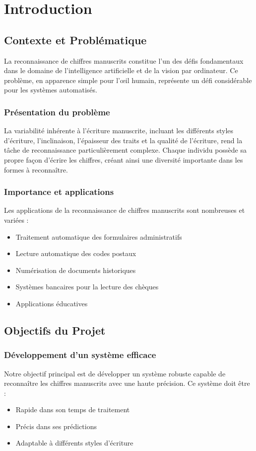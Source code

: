 \chapter{Introduction}

\section{Contexte et Problématique}

La reconnaissance de chiffres manuscrits constitue l'un des défis fondamentaux dans le domaine de l'intelligence artificielle et de la vision par ordinateur. Ce problème, en apparence simple pour l'œil humain, représente un défi considérable pour les systèmes automatisés.

\subsection{Présentation du problème}
La variabilité inhérente à l'écriture manuscrite, incluant les différents styles d'écriture, l'inclinaison, l'épaisseur des traits et la qualité de l'écriture, rend la tâche de reconnaissance particulièrement complexe. Chaque individu possède sa propre façon d'écrire les chiffres, créant ainsi une diversité importante dans les formes à reconnaître.

\subsection{Importance et applications}
Les applications de la reconnaissance de chiffres manuscrits sont nombreuses et variées :
\begin{itemize}
    \item Traitement automatique des formulaires administratifs
    \item Lecture automatique des codes postaux
    \item Numérisation de documents historiques
    \item Systèmes bancaires pour la lecture des chèques
    \item Applications éducatives
\end{itemize}

\section{Objectifs du Projet}

\subsection{Développement d'un système efficace}
Notre objectif principal est de développer un système robuste capable de reconnaître les chiffres manuscrits avec une haute précision. Ce système doit être :
\begin{itemize}
    \item Rapide dans son temps de traitement
    \item Précis dans ses prédictions
    \item Adaptable à différents styles d'écriture
\end{itemize}


